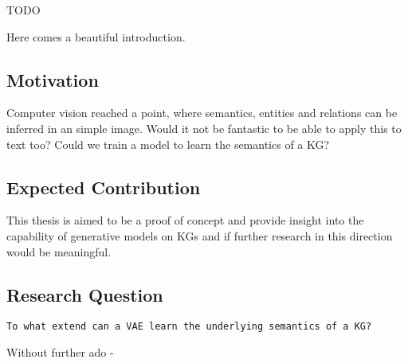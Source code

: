 
TODO

Here comes a beautiful introduction. %

\subsection{Motivation}


Computer vision reached a point, where semantics, entities and relations can be inferred in an simple image.
Would it not be fantastic to be able to apply this to text too?
Could we train a model to learn the semantics of a KG?

\subsection{Expected Contribution}

This thesis is aimed to be a proof of concept and provide insight into the capability of generative models on KGs and if further research in this direction would be meaningful.

\subsection{Research Question}

\texttt{To what extend can a VAE learn the underlying semantics of a KG?}


Without further ado -
